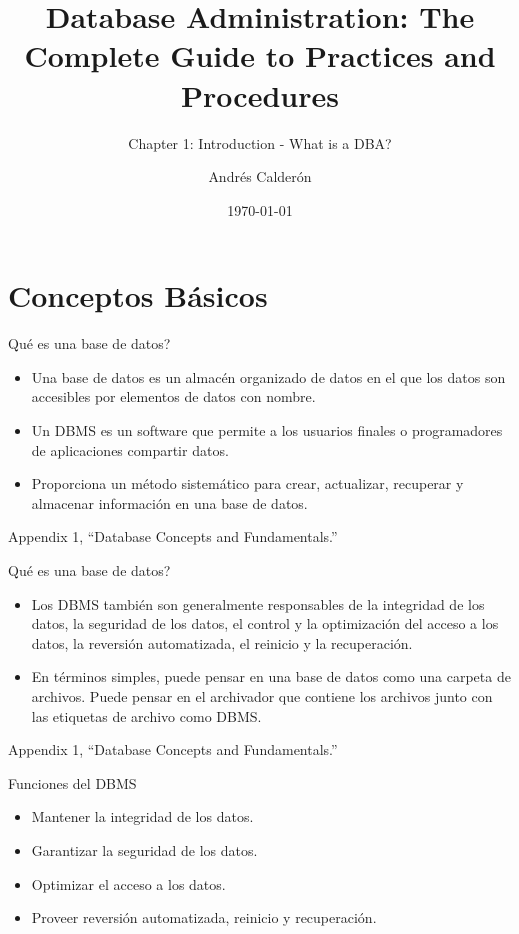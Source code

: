 \documentclass{beamer}
\title{Database Administration: The Complete Guide to Practices and Procedures}
\subtitle{Chapter 1: Introduction - What is a DBA?}
\author{Andrés Calderón}
\date{\today}
\newcommand{\toRight}[1]{
    \begin{FlushRight}
        {\tiny #1}
    \end{FlushRight}
} %
\begin{document}
\frame{\titlepage}

\section{Conceptos Básicos}

\begin{frame}{Qué es una base de datos?}
    \begin{itemize}
        \item Una base de datos es un almacén organizado de datos en el que los datos son accesibles por elementos de datos con nombre. 
        \item Un DBMS es un software que permite a los usuarios finales o programadores de aplicaciones compartir datos.
        \item Proporciona un método sistemático para crear, actualizar, recuperar y almacenar información en una base de datos.
    \end{itemize}
    \toRight{Appendix 1, “Database Concepts and Fundamentals.”}
\end{frame}

\begin{frame}{Qué es una base de datos?}
    \begin{itemize}
        \item Los DBMS también son generalmente responsables de la integridad de los datos, la seguridad de los datos, el control y la optimización del acceso a los datos, la reversión automatizada, el reinicio y la recuperación. 
        \item En términos simples, puede pensar en una base de datos como una carpeta de archivos. Puede pensar en el archivador que contiene los archivos junto con las etiquetas de archivo como DBMS.
    \end{itemize}
    \toRight{Appendix 1, “Database Concepts and Fundamentals.”}
\end{frame}

\begin{frame}{Funciones del DBMS}
    \begin{itemize}
        \item Mantener la integridad de los datos.
        \item Garantizar la seguridad de los datos.
        \item Optimizar el acceso a los datos.
        \item Proveer reversión automatizada, reinicio y recuperación.
    \end{itemize}
\end{frame}
\end{document}
